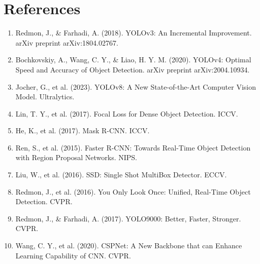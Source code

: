 \documentclass[12pt,a4paper]{article}
\begin{document}
\section{References}

\begin{enumerate}
    \item Redmon, J., \& Farhadi, A. (2018). YOLOv3: An Incremental Improvement. arXiv preprint arXiv:1804.02767.
    \item Bochkovskiy, A., Wang, C. Y., \& Liao, H. Y. M. (2020). YOLOv4: Optimal Speed and Accuracy of Object Detection. arXiv preprint arXiv:2004.10934.
    \item Jocher, G., et al. (2023). YOLOv8: A New State-of-the-Art Computer Vision Model. Ultralytics.
    \item Lin, T. Y., et al. (2017). Focal Loss for Dense Object Detection. ICCV.
    \item He, K., et al. (2017). Mask R-CNN. ICCV.
    \item Ren, S., et al. (2015). Faster R-CNN: Towards Real-Time Object Detection with Region Proposal Networks. NIPS.
    \item Liu, W., et al. (2016). SSD: Single Shot MultiBox Detector. ECCV.
    \item Redmon, J., et al. (2016). You Only Look Once: Unified, Real-Time Object Detection. CVPR.
    \item Redmon, J., \& Farhadi, A. (2017). YOLO9000: Better, Faster, Stronger. CVPR.
    \item Wang, C. Y., et al. (2020). CSPNet: A New Backbone that can Enhance Learning Capability of CNN. CVPR.
\end{enumerate}
\end{document}
